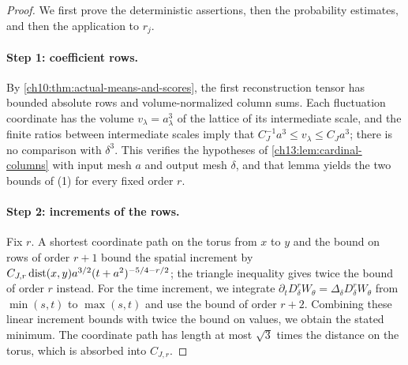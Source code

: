 \begin{proof}
We first prove the deterministic assertions, then the probability estimates, and then the application to $r_j$.

\paragraph{Step 1: coefficient rows.}
By \cref{ch10:thm:actual-means-and-scores}, the first reconstruction tensor has bounded absolute rows and volume-normalized column sums. Each fluctuation coordinate has the volume $v_\lambda=a_\lambda^3$ of the lattice of its intermediate scale, and the finite ratios between intermediate scales imply that $C_J^{-1}a^3\le v_\lambda\le C_Ja^3$; there is no comparison with $\delta^3$. This verifies the hypotheses of \cref{ch13:lem:cardinal-columns} with input mesh $a$ and output mesh $\delta$, and that lemma yields the two bounds of (1) for every fixed order $r$.

\paragraph{Step 2: increments of the rows.}
Fix $r$. A shortest coordinate path on the torus from $x$ to $y$ and the bound on rows of order $r+1$ bound the spatial increment by $C_{J,r}\operatorname{dist}(x,y)a^{3/2}(t+a^2)^{-5/4-r/2}$; the triangle inequality gives twice the bound of order $r$ instead. For the time increment, we integrate $\partial_tD_\delta^rW_\theta=\Delta_\delta D_\delta^rW_\theta$ from $\min(s,t)$ to $\max(s,t)$ and use the bound of order $r+2$. Combining these linear increment bounds with twice the bound on values, we obtain the stated minimum. The coordinate path has length at most $\sqrt3$ times the distance on the torus, which is absorbed into $C_{J,r}$.


\end{proof}
